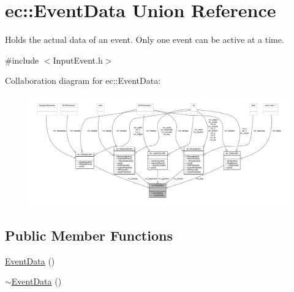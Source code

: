 \hypertarget{unionec_1_1_event_data}{}\section{ec\+:\+:Event\+Data Union Reference}
\label{unionec_1_1_event_data}


Holds the actual data of an event. Only one event can be active at a time.  




{\ttfamily \#include $<$Input\+Event.\+h$>$}



Collaboration diagram for ec\+:\+:Event\+Data\+:\nopagebreak
\begin{figure}[H]
\begin{center}
\leavevmode
\includegraphics[width=350pt]{unionec_1_1_event_data__coll__graph}
\end{center}
\end{figure}
\subsection*{Public Member Functions}
\begin{DoxyCompactItemize}
\item 
\mbox{\hyperlink{unionec_1_1_event_data_a8276eb2c2eee85aeb6d6911992affce6}{Event\+Data}} ()
\item 
\mbox{\hyperlink{unionec_1_1_event_data_a4f016745a6af3e6d4823afb8979f38ad}{$\sim$\+Event\+Data}} ()
\end{DoxyCompactItemize}
